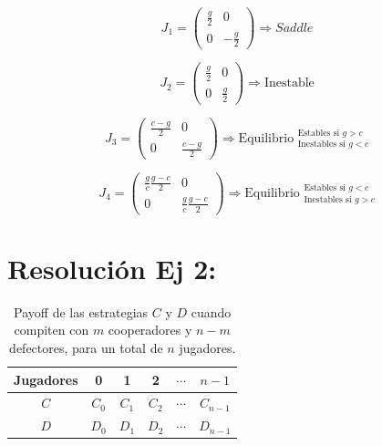 \documentclass[twocolumn,aps,prl]{revtex4-1}
\begin{document}

$$ J_1 =
\begin{pmatrix}
    \frac{g}{2}
    &
    0
    \\  
    0
    &
    -\frac{g}{2}
\end{pmatrix}
\Rightarrow Saddle
$$

$$ J_2 =
\begin{pmatrix}
    \frac{g}{2}
    &
    0
    \\  
    0
    &
    \frac{g}{2}
\end{pmatrix}
\Rightarrow \text{Inestable}
$$

$$ J_3 =
\begin{pmatrix}
    \frac{c-g}{2}
    &
    0
    \\  
    0
    &
    \frac{c-g}{2}
\end{pmatrix}
\Rightarrow \text{Equilibrio }  ^{\text{Estables si } g>c}_{\text{Inestables si } g<c}
$$

$$ J_4 =
\begin{pmatrix}
    \frac{g}{c} \frac{g-c}{2}
    &
    0
    \\  
    0
    &
    \frac{g}{c} \frac{g-c}{2}
\end{pmatrix}
\Rightarrow \text{Equilibrio }  ^{\text{Estables si } g<c}_{\text{Inestables si } g>c}
$$

\section{Resolución Ej 2:}


\begin{table}[!ht]
    \begin{tabular}{c|ccccc}
    Jugadores & 0       & 1       & 2       & $\cdots$ & $n-1$     \\ \hline
    $C$       & $C_{0}$ & $C_{1}$ & $C_{2}$ & $\cdots$ & $C_{n-1}$ \\ \hline
    $D$       & $D_{0}$ & $D_{1}$ & $D_{2}$ & $\cdots$ & $D_{n-1}$
    \end{tabular}
    \caption{Payoff de las estrategias $C$ y $D$ cuando compiten con $m$ cooperadores y $n-m$ defectores, para un total de $n$ jugadores.}
    \label{tab:my-table}
\end{table}
\end{document}
